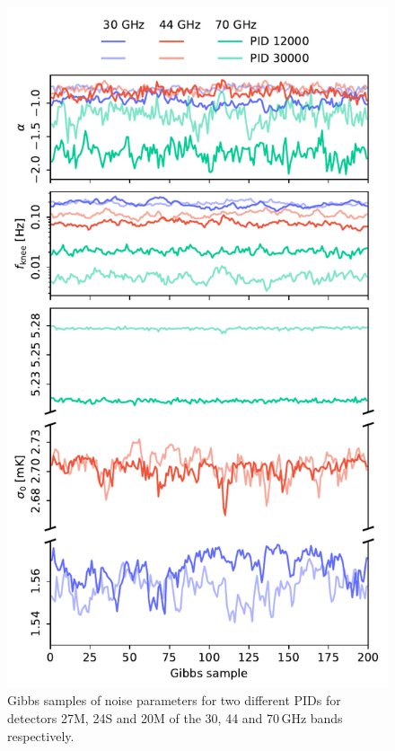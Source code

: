\documentclass[twocolumn]{aa}
\begin{document}
\begin{figure}
	\begin{center}
		\includegraphics[width=\linewidth]{figs/gibbs_samples.pdf}
	\end{center}
	\caption{Gibbs samples of noise parameters for two different PIDs for detectors 27M, 24S and 20M of the 30, 44 and 70\,GHz bands respectively.
	\label{fig:samples}}
\end{figure}
\end{document}
